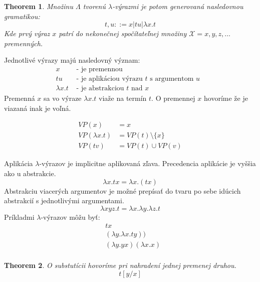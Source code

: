\documentclass[a4paper,10pt,oneside]{report}%
\newtheorem{theorem}{Theorem}
\begin{document}
\begin{theorem}
    Množinu $\Lambda$ tvorenú $\lambda$-výrazmi je potom generovaná nasledovnou gramatikou:
    \begin{equation}
        t, u ::= x | t u | \lambda x.t
    \end{equation}
    Kde prvý výraz $x$ patrí do nekonečnej spočítateľnej množiny $\mathcal{X}={x,y,z,\dots}$
premenných.
\end{theorem}
    Jednotlivé výrazy majú nasledovný význam:
\begin{align*}
     x          & \textrm{ - je premennou }\\
     t u        & \textrm{ - je aplikáciou výrazu $t$ s argumentom $u$ }\\
    \lambda x.t & \textrm{ - je abstrakciou $t$ nad $x$ }
\end{align*}
    Premenná $x$ sa vo výraze $\lambda x . t$ viaže na termín $t$. O premennej
$x$ hovoríme že je viazaná inak je voľná.

\begin{center}
    \begin{align*}
        VP(x) &= {x} \\
        VP(\lambda x.t) &= VP(t)  \setminus \{x\} \\
        VP(t v) &= VP(t) \cup VP(v)
    \end{align*}
\end{center}
    Aplikácia $\lambda$-výrazov je implicitne aplikovaná zľava.
    Precedencia aplikácie je vyššia ako u abstrakcie.
\begin{equation*}
    \lambda x . t x = \lambda x . (t x)
\end{equation*}
    Abstrakciu viacerých argumentov je možné prepísať do tvaru po sebe idúcich
abstrakcií s jednotlivými argumentami.
\begin{equation*}
    \lambda x y z . t = \lambda x . \lambda y . \lambda z . t
\end{equation*}
    Príkladmi $\lambda$-výrazov môžu byť:
\begin{align*}
    & t x                             \\
    & (\lambda y . \lambda x . t y )) \\
    & (\lambda y.y x) (\lambda x . x) \\
\end{align*}
\begin{theorem}
    O substutícii hovoríme pri nahradení jednej premenej druhou.
    \begin{equation}
        t [ y / x ]
    \end{equation}
\end{theorem}
\end{document}
